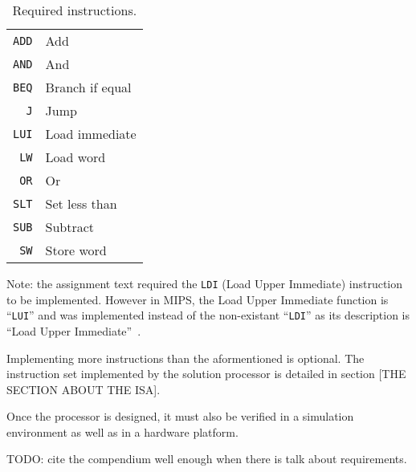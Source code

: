 \begin{table}
    \begin{center}
        \begin{tabular}{r|l}
            \texttt{ADD} & Add \\
            \texttt{AND} & And \\
            \texttt{BEQ} & Branch if equal \\
            \texttt{J} & Jump \\
            \texttt{LUI} & Load immediate \\
            \texttt{LW} & Load word \\
            \texttt{OR} & Or \\
            \texttt{SLT} & Set less than \\
            \texttt{SUB} & Subtract \\
            \texttt{SW} & Store word \\
            \hline
        \end{tabular}
        \smallskip
        \smallskip
        \caption{Required instructions.}
        \label{table:required-instructions}
    \end{center}
\end{table}

Note: the assignment text required the \texttt{LDI} (Load Upper Immediate) instruction to be implemented. However in MIPS, the Load Upper Immediate function is ``\texttt{LUI}'' and was implemented instead of the non-existant ``\texttt{LDI}'' as its description is ``Load Upper Immediate''~\cite[p.129]{mips32-instruction-set}.

Implementing more instructions than the aformentioned is optional.
The instruction set implemented by the solution processor is detailed in section [THE SECTION ABOUT THE ISA].

Once the processor is designed, it must also be verified in a simulation environment as well as in a hardware platform.

TODO: cite the compendium well enough when there is talk about requirements.
